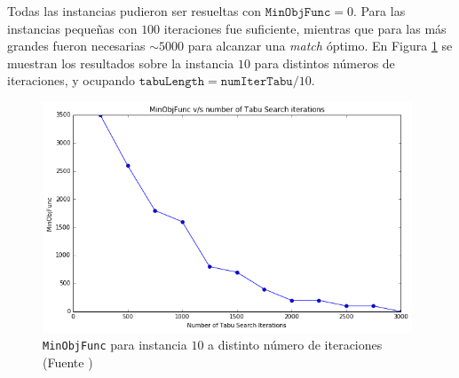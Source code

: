 \documentclass[letter, 10pt]{article}
\begin{document}
\begin{description}
    Todas las instancias pudieron ser resueltas con $\texttt{MinObjFunc}=0$. Para las instancias pequeñas con $100$ iteraciones fue suficiente, mientras que para las más grandes fueron necesarias $\sim5000$ para alcanzar una \textit{match} óptimo. En Figura \ref{fig:minobj2} se muestran los resultados sobre la instancia $10$ para distintos números de iteraciones, y ocupando $\texttt{tabuLength}=\texttt{numIterTabu}/10$. 

    \begin{figure}[htpb!]
    \centering
    \includegraphics[width=11cm]{minobjfunc2}
    \caption{\texttt{MinObjFunc} para instancia $10$ a distinto número de iteraciones (Fuente \cite{Higgins})}
    \label{fig:minobj2}
    \end{figure}


\end{description}
\end{document}
